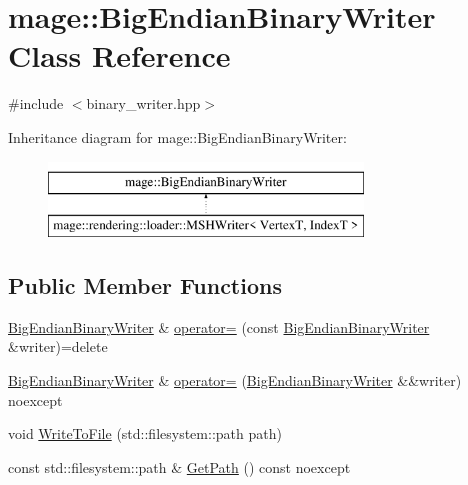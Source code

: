 \hypertarget{classmage_1_1_big_endian_binary_writer}{}\section{mage\+:\+:Big\+Endian\+Binary\+Writer Class Reference}
\label{classmage_1_1_big_endian_binary_writer}


{\ttfamily \#include $<$binary\+\_\+writer.\+hpp$>$}

Inheritance diagram for mage\+:\+:Big\+Endian\+Binary\+Writer\+:\begin{figure}[H]
\begin{center}
\leavevmode
\includegraphics[height=2.000000cm]{classmage_1_1_big_endian_binary_writer}
\end{center}
\end{figure}
\subsection*{Public Member Functions}
\begin{DoxyCompactItemize}
\item 
\mbox{\hyperlink{classmage_1_1_big_endian_binary_writer}{Big\+Endian\+Binary\+Writer}} \& \mbox{\hyperlink{classmage_1_1_big_endian_binary_writer_ae574f7d0b630890256996c52818ba633}{operator=}} (const \mbox{\hyperlink{classmage_1_1_big_endian_binary_writer}{Big\+Endian\+Binary\+Writer}} \&writer)=delete
\item 
\mbox{\hyperlink{classmage_1_1_big_endian_binary_writer}{Big\+Endian\+Binary\+Writer}} \& \mbox{\hyperlink{classmage_1_1_big_endian_binary_writer_a8c01bf43f5e941578c5c5947ea184a78}{operator=}} (\mbox{\hyperlink{classmage_1_1_big_endian_binary_writer}{Big\+Endian\+Binary\+Writer}} \&\&writer) noexcept
\item 
void \mbox{\hyperlink{classmage_1_1_big_endian_binary_writer_a6ce9780687a45a6c6f98e0843190b63b}{Write\+To\+File}} (std\+::filesystem\+::path path)
\item 
const std\+::filesystem\+::path \& \mbox{\hyperlink{classmage_1_1_big_endian_binary_writer_a812e65c16bf1b14d396d109eb969eeb8}{Get\+Path}} () const noexcept
\end{DoxyCompactItemize}
